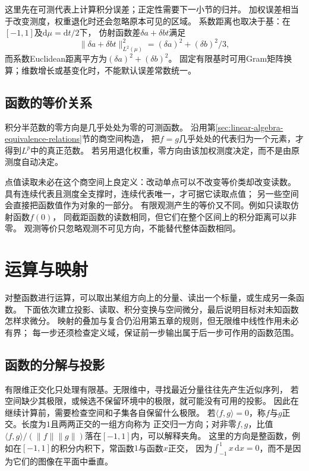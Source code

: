这里先在可测代表上计算积分误差；正定性需要下一小节的归并。
加权误差相当于改变测度，权重退化时还会忽略原本可见的区域。
系数距离也取决于基：在$[-1,1]$及$\mathrm d\mu=\mathrm dt/2$下，
仿射函数差$\delta a+\delta bt$满足
\[
 \lVert\delta a+\delta bt\rVert_{L^2(\mu)}^2
 =(\delta a)^2+(\delta b)^2/3,
\]
而系数Euclidean距离平方为$(\delta a)^2+(\delta b)^2$。
固定有限基时可用Gram矩阵换算；维数增长或基变化时，不能默认误差常数统一。

\subsection{函数的等价关系}
\label{sec:functional-equivalence-relations}

积分半范数的零方向是几乎处处为零的可测函数。
沿用第\ref{sec:linear-algebra-equivalence-relations}节的商空间构造，
把$f=g$几乎处处的代表归为一个元素，才得到$L^p$中的真正范数。
若另用退化权重，零方向由该加权测度决定，而不是由原测度自动决定。

点值读取未必在这个商空间上良定义：改动单点可以不改变等价类却改变读数。
具有连续代表且测度全支撑时，连续代表唯一，才可据它读取点值；
另一些空间会直接把函数值作为对象的一部分。
有限观测产生的等价又不同。例如只读取仿射函数$f(0)$，
同截距函数的读数相同，但它们在整个区间上的积分距离可以非零。
观测等价只忽略观测不可见方向，不能替代整体函数相同。

\section{运算与映射}
\label{sec:functional-operators}

对整函数进行运算，可以取出某组方向上的分量、读出一个标量，或生成另一条函数。
下面依次建立投影、读取、积分变换与空间微分，最后说明目标对未知函数怎样求微分。
映射的叠加与复合仍沿用第五章的规则，但无限维中线性作用未必有界；
每一步还须检查定义域，保证前一步输出属于后一步可作用的函数范围。

\subsection{函数的分解与投影}
\label{sec:functional-decomposition-projection}
\label{sec:functional-orthogonal-expansions-projections}

\label{sec:functional-projection-approximation}

有限维正交化只处理有限基。无限维中，寻找最近分量往往先产生近似序列，
若空间缺少其极限，或候选不保留环境中的极限，就可能没有可用的投影。
因此在继续计算前，需要检查空间和子集各自保留什么极限。
若$\langle f,g\rangle=0$，称$f$与$g$正交。长度为$1$且两两正交的一组方向称为
正交归一方向；对非零$f,g$，比值
$\langle f,g\rangle/(\lVert f\rVert\lVert g\rVert)$落在$[-1,1]$内，可以解释夹角。
这里的方向是整函数，例如在$[-1,1]$的积分内积下，常函数$1$与函数$x$正交，
因为$\int_{-1}^1x\,\mathrm dx=0$，而不是因为它们的图像在平面中垂直。

